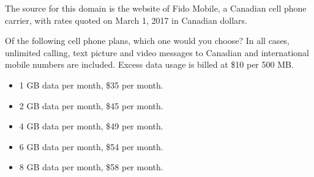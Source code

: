 The source for this domain is the website of Fido Mobile, a Canadian cell phone carrier, with rates quoted on March 1, 2017 in Canadian dollars.

\begin{tcolorbox}
Of the following cell phone plans, which one would you choose? In all cases, unlimited calling, text picture and video messages to Canadian and international mobile numbers are included. Excess data usage is billed at \$10 per 500 MB.

\begin{itemize}
	\item 1 GB data per month, \$35 per month.
	\item 2 GB data per month, \$45 per month.
	\item 4 GB data per month, \$49 per month.
	\item 6 GB data per month, \$54 per month.
	\item 8 GB data per month, \$58 per month.
\end{itemize}
\end{tcolorbox}
